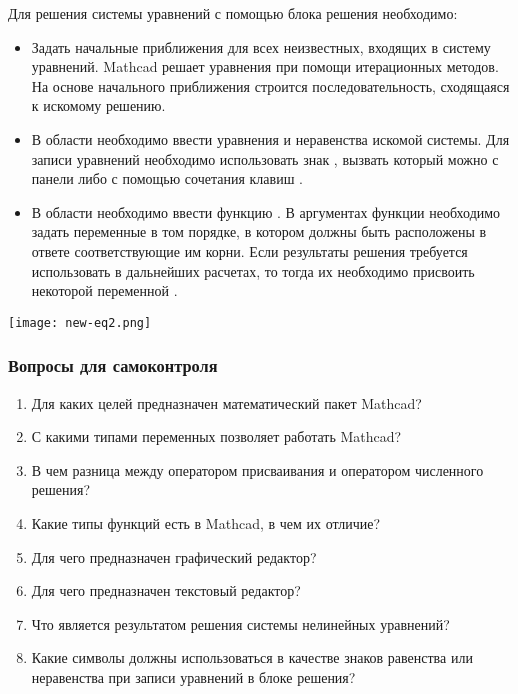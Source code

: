 Для решения системы уравнений с помощью блока решения необходимо:
\begin{itemize}
	\item Задать начальные приближения для всех неизвестных, входящих в систему уравнений. Mathcad решает уравнения при помощи итерационных методов. На основе начального приближения строится последовательность, сходящаяся к искомому решению.
	\item В области  необходимо ввести уравнения и неравенства искомой системы. Для записи уравнений необходимо использовать знак , вызвать который можно с панели  либо с помощью сочетания клавиш \keys{\ctrl+=}.
	\item В области  необходимо ввести функцию . В аргументах функции необходимо задать переменные в том порядке, в котором должны быть расположены в ответе соответствующие им корни. Если результаты решения требуется использовать в дальнейших расчетах, то тогда их необходимо присвоить некоторой переменной .
\end{itemize}

\begin{center}
	\texttt{[image: new-eq2.png]}
\end{center}


\subsubsection*{Вопросы для самоконтроля}
\begin{enumerate}
	\item Для каких целей предназначен математический пакет Mathcad?
	\item С какими типами переменных позволяет работать Mathcad?
	\item В чем разница между оператором присваивания и оператором численного решения?
	\item Какие типы функций есть в Mathcad, в чем их отличие?
	\item Для чего предназначен графический редактор?
	\item Для чего предназначен текстовый редактор?
	\item Что является результатом решения системы нелинейных уравнений?
	\item Какие символы должны использоваться в качестве знаков равенства или неравенства при записи уравнений в блоке решения?
\end{enumerate}

